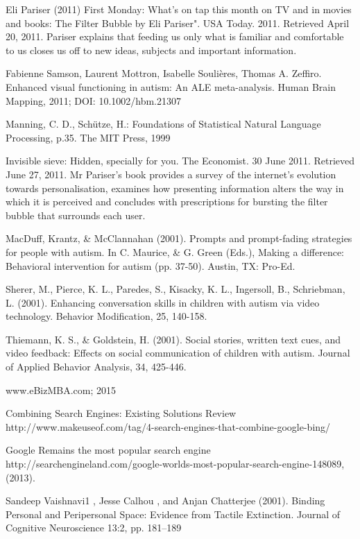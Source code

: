 \documentclass[10pt]{article}
\begin{document}
\begin{thebibliography}{100}
Eli Pariser (2011) First Monday: What's on tap this month on TV and in movies and books: The Filter Bubble by Eli Pariser". USA Today. 2011. Retrieved April 20, 2011. Pariser explains that feeding us only what is familiar and comfortable to us closes us off to new ideas, subjects and important information.

Fabienne Samson, Laurent Mottron, Isabelle Soulières, Thomas A. Zeffiro. Enhanced visual functioning in autism: An ALE meta-analysis. Human Brain Mapping, 2011; DOI: 10.1002/hbm.21307

Manning, C. D., Schütze, H.: Foundations of Statistical Natural Language Processing, p.35. The MIT Press, 1999

 Invisible sieve: Hidden, specially for you. The Economist. 30 June 2011. Retrieved June 27, 2011. Mr Pariser’s book provides a survey of the internet’s evolution towards personalisation, examines how presenting information alters the way in which it is perceived and concludes with prescriptions for bursting the filter bubble that surrounds each user.

 MacDuff, Krantz, \& McClannahan (2001). Prompts and prompt-fading strategies for people with autism. In C. Maurice, \& G. Green (Eds.), Making a difference: Behavioral intervention for autism (pp. 37-50). Austin, TX: Pro-Ed.


Sherer, M., Pierce, K. L., Paredes, S., Kisacky, K. L., Ingersoll, B., Schriebman, L. (2001). Enhancing conversation skills in children with autism via video technology. Behavior Modification, 25, 140-158.


Thiemann, K. S., \& Goldstein, H. (2001). Social stories, written text cues, and video feedback: Effects on social communication of children with autism. Journal of Applied Behavior Analysis, 34, 425-446.

www.eBizMBA.com; 2015

Combining Search Engines: Existing Solutions Review
http://www.makeuseof.com/tag/4-search-engines-that-combine-google-bing/


Google Remains the most popular search engine http://searchengineland.com/google-worlds-most-popular-search-engine-148089, (2013).  


Sandeep Vaishnavi1 , Jesse Calhou , and Anjan Chatterjee (2001). Binding Personal and Peripersonal Space: Evidence from Tactile Extinction. Journal of Cognitive Neuroscience 13:2, pp. 181–189



\end{thebibliography}
\end{document}
